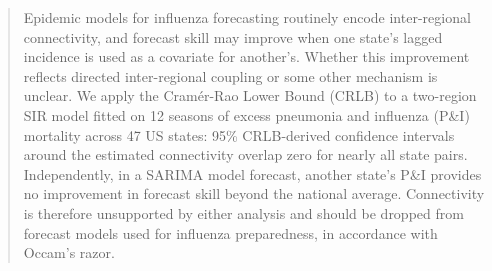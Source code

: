 \begin{abstract}
Epidemic models for influenza forecasting routinely encode
inter-regional connectivity, and forecast skill may improve when one
state's lagged incidence is used as a covariate for another's. Whether
this improvement reflects directed inter-regional coupling or some
other mechanism is unclear. We apply the Cramér-Rao Lower Bound (CRLB)
to a two-region SIR model fitted on 12 seasons of excess pneumonia and
influenza (P\&I) mortality across 47 US states: 95\% CRLB-derived
confidence intervals around the estimated connectivity overlap zero
for nearly all state pairs. Independently, in a SARIMA model forecast,
another state's P\&I provides no improvement in forecast skill beyond
the national average. Connectivity is therefore unsupported by either
analysis and should be dropped from forecast models used for influenza
preparedness, in accordance with Occam's razor.
\end{abstract}

